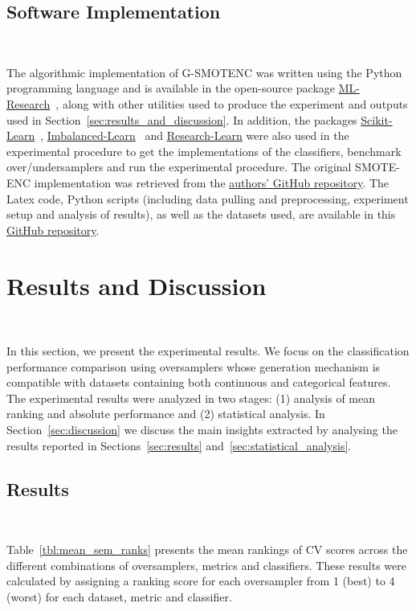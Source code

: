 \documentclass[preprint,12pt]{elsarticle}
\begin{document}
{\subsection{Software Implementation}~\label{sec:software_implementation}

The algorithmic implementation of G-SMOTENC was written using the Python
programming language and is available in the open-source package
\href{https://github.com/joaopfonseca/ml-research}{ML-Research}~\cite{fonseca2021increasing},
along with other utilities used to produce the experiment and outputs used in
Section~\ref{sec:results_and_discussion}. In addition, the packages
\href{https://github.com/scikit-learn/scikit-learn/}{Scikit-Learn}~\cite{scikit-learn},
\href{https://github.com/scikit-learn-contrib/imbalanced-learn}{Imbalanced-Learn}~\cite{JMLR:v18:16-365}
and \href{https://github.com/georgedouzas/research-learn/}{Research-Learn}
were also used in the experimental procedure to get the implementations of the
classifiers, benchmark over/undersamplers and run the experimental procedure.
The original SMOTE-ENC implementation was retrieved from the
\href{https://github.com/Mimimkh/SMOTE-ENC-code}{authors' GitHub repository}.
The Latex code, Python scripts (including data pulling and preprocessing,
experiment setup and analysis of results), as well as the datasets used, are
available in this \href{https://github.com/joaopfonseca/publications}{GitHub
repository}.
 
\section{Results and Discussion}~\label{sec:results_and_discussion}

In this section, we present the experimental results. We focus on the
classification performance comparison using oversamplers whose generation
mechanism is compatible with datasets containing both continuous and
categorical features. The experimental results were analyzed in two stages:
(1) analysis of mean ranking and absolute performance and (2) statistical
analysis. In Section~\ref{sec:discussion} we discuss the main insights
extracted by analysing the results reported in Sections~\ref{sec:results}
and~\ref{sec:statistical_analysis}.

\subsection{Results}~\label{sec:results}

Table~\ref{tbl:mean_sem_ranks} presents the mean rankings of CV 
scores across the different combinations of oversamplers, metrics and
classifiers. These results were calculated by assigning a ranking score for
each oversampler from 1 (best) to 4 (worst) for each dataset, metric and
classifier.

}
\end{document}
